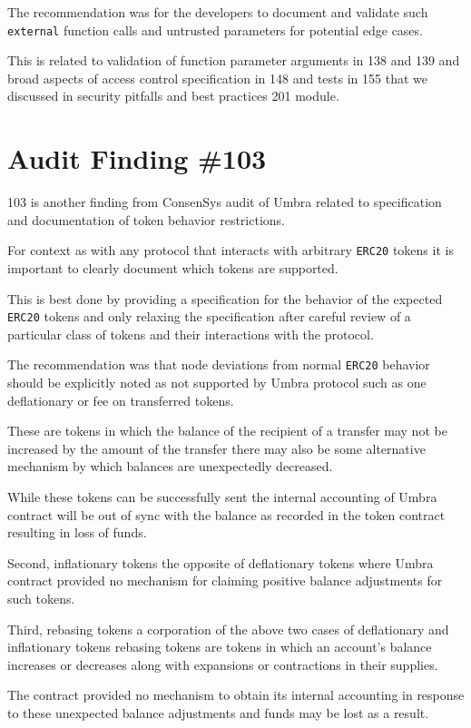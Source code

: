 The recommendation was for the developers to document and validate such \verb|external| function calls and untrusted parameters for potential edge cases. 

This is related to validation of function parameter arguments in 138 and 139 and broad aspects of access control specification in 148 and tests in 155 that we discussed in security pitfalls and best practices 201 module.

\section{Audit Finding \#103}

103 is another finding from ConsenSys audit of Umbra related to specification and documentation of token behavior restrictions. 

For context as with any protocol that interacts with arbitrary \verb|ERC20| tokens it is important to clearly document which tokens are supported. 

This is best done by providing a specification for the behavior of the expected \verb|ERC20| tokens and only relaxing the specification after careful review of a particular class of tokens and their interactions with the protocol. 

The recommendation was that node deviations from normal \verb|ERC20| behavior should be explicitly noted as not supported by Umbra protocol such as one deflationary or fee on transferred tokens. 

These are tokens in which the balance of the recipient of a transfer may not be increased by the amount of the transfer there may also be some alternative mechanism by which balances are unexpectedly decreased. 

While these tokens can be successfully sent the internal accounting of Umbra contract will be out of sync with the balance as recorded in the token contract resulting in loss of funds. 

Second, inflationary tokens the opposite of deflationary tokens where Umbra contract provided no mechanism for claiming positive balance adjustments for such tokens.  

Third, rebasing tokens a corporation of the above two cases of deflationary and inflationary tokens rebasing tokens are tokens in which an account's balance increases or decreases along with expansions or contractions in their supplies. 

The contract provided no mechanism to obtain its internal accounting in response to these unexpected balance adjustments and funds may be lost as a result. 

